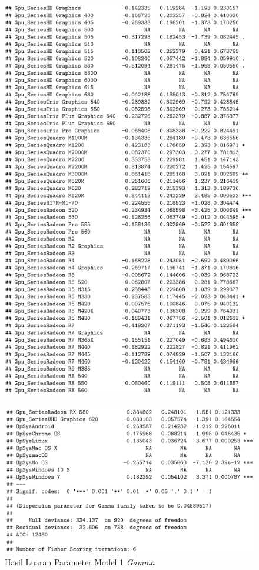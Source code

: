 \documentclass[12pt]{article}
\begin{document}
\begin{figure}[h!]
    \centering
    \includegraphics{Model_1_Sum(4_3).png}
    \label{fig:SUM14}
\end{figure}
\begin{figure}[h!]
    \centering
    \includegraphics{Model_1_Sum(5_3).png}
    \caption{Hasil Luaran Parameter Model 1 \textit{Gamma}}
    \label{fig:SUM15}
\end{figure}
\end{document}
